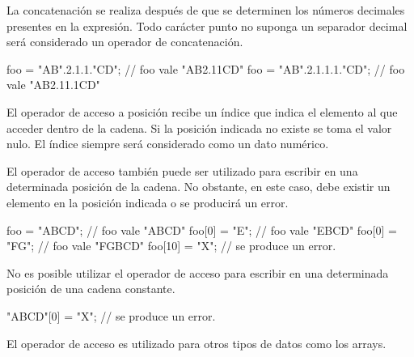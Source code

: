 La concatenación se realiza después de que se determinen los números decimales presentes en la 
expresión. Todo carácter punto no suponga un separador decimal será considerado un operador
de concatenación.\\  

\begin{myverbatim}
   foo = "AB".2.1.1."CD"; // foo vale "AB2.11CD"
   foo = "AB".2.1.1.1."CD"; // foo vale "AB2.11.1CD"
\end{myverbatim} 

El operador de acceso a posición recibe un índice que indica el elemento al que acceder dentro de la 
cadena. Si la posición indicada no existe se toma el valor nulo. El índice siempre será considerado como un 
dato numérico.

El operador de acceso también puede ser utilizado para escribir en una determinada posición de la cadena.
No obstante, en este caso, debe existir un elemento en la posición indicada o se producirá un error. \\

\begin{myverbatim}
   foo = "ABCD"; // foo vale "ABCD"
   foo[0] = "E"; // foo vale "EBCD"
   foo[0] = "FG"; // foo vale "FGBCD"
   foo[10] = "X"; // se produce un error.
\end{myverbatim} 

No es posible utilizar el operador de acceso para escribir en una determinada posición de una cadena constante. \\

\begin{myverbatim}
   "ABCD"[0] = "X"; // se produce un error.
\end{myverbatim} 

El operador de acceso es utilizado para otros tipos de datos como los arrays.


